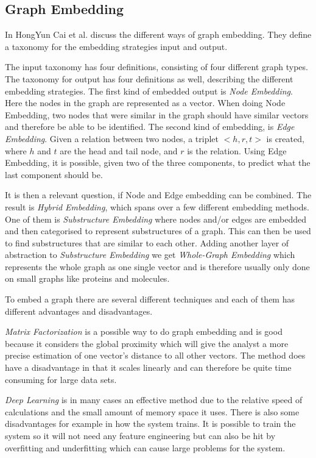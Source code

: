 \subsection{Graph Embedding}
\label{Graph_embedding}
In \cite{8294302} HongYun Cai et al. discuss the different ways of graph embedding. They define a taxonomy for the embedding strategies input and output.

The input taxonomy has four definitions, consisting of four different graph types. The taxonomy for output has four definitions as well, describing the different embedding strategies. The first kind of embedded output is \textit{Node Embedding}. Here the nodes in the graph are represented as a vector. When doing Node Embedding, two nodes that were similar in the graph should have similar vectors and therefore be able to be identified\cite{8294302}. The second kind of embedding, is \textit{Edge Embedding}. Given a relation between two nodes, a triplet $<h,r,t>$ is created,  where $h$ and $t$ are the head and tail node, and $r$ is the relation. Using Edge Embedding, it is possible, given two of the three components, to predict what the last component should be\cite{8294302}.


It is then a relevant question, if Node and Edge embedding can be combined. The result is \textit{Hybrid Embedding}, which spans over a few different embedding methods. One of them is \textit{Substructure Embedding} where nodes and/or edges are embedded and then categorised to represent substructures of a graph. This can then be used to find substructures that are similar to each other\cite{8294302}.
Adding another layer of abstraction to \textit{Substructure Embedding} we get \textit{Whole-Graph Embedding} which represents the whole graph as one single vector and is therefore usually only done on small graphs like proteins and molecules\cite{8294302}.

To embed a graph there are several different techniques and each of them has different advantages and disadvantages.

\textit{Matrix Factorization} is a possible way to do graph embedding and is good because it considers the global proximity which will give the analyst a more precise estimation of one vector's distance to all other vectors. The method does have a disadvantage in that it scales linearly and can therefore be quite time consuming for large data sets\cite{8294302}.

\textit{Deep Learning} is in many cases an effective method due to the relative speed of calculations and the small amount of memory space it uses. There is also some disadvantages for example in how the system trains. It is possible to train the system so it will not need any feature engineering but can also be hit by overfitting and underfitting which can cause large problems for the system\cite{8294302}.

